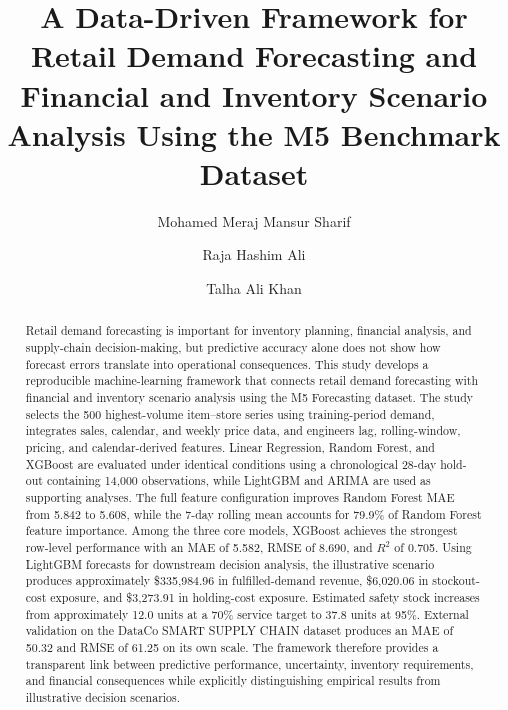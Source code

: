 \begin{frontmatter}

\title{A Data-Driven Framework for Retail Demand Forecasting and Financial and Inventory Scenario Analysis Using the M5 Benchmark Dataset}

\author[label1]{Mohamed Meraj Mansur Sharif}
\author[label1]{Raja Hashim Ali}
\author[label1]{Talha Ali Khan}


\begin{abstract}
Retail demand forecasting is important for inventory planning, financial analysis, and supply-chain decision-making, but predictive accuracy alone does not show how forecast errors translate into operational consequences.
This study develops a reproducible machine-learning framework that connects retail demand forecasting with financial and inventory scenario analysis using the M5 Forecasting dataset.
The study selects the 500 highest-volume item--store series using training-period demand, integrates sales, calendar, and weekly price data, and engineers lag, rolling-window, pricing, and calendar-derived features.
Linear Regression, Random Forest, and XGBoost are evaluated under identical conditions using a chronological 28-day hold-out containing 14,000 observations, while LightGBM and ARIMA are used as supporting analyses.
The full feature configuration improves Random Forest MAE from 5.842 to 5.608, while the 7-day rolling mean accounts for 79.9\% of Random Forest feature importance.
Among the three core models, XGBoost achieves the strongest row-level performance with an MAE of 5.582, RMSE of 8.690, and $R^2$ of 0.705.
Using LightGBM forecasts for downstream decision analysis, the illustrative scenario produces approximately \$335,984.96 in fulfilled-demand revenue, \$6,020.06 in stockout-cost exposure, and \$3,273.91 in holding-cost exposure.
Estimated safety stock increases from approximately 12.0 units at a 70\% service target to 37.8 units at 95\%.
External validation on the DataCo SMART SUPPLY CHAIN dataset produces an MAE of 50.32 and RMSE of 61.25 on its own scale.
The framework therefore provides a transparent link between predictive performance, uncertainty, inventory requirements, and financial consequences while explicitly distinguishing empirical results from illustrative decision scenarios.
\end{abstract}


\end{frontmatter}
